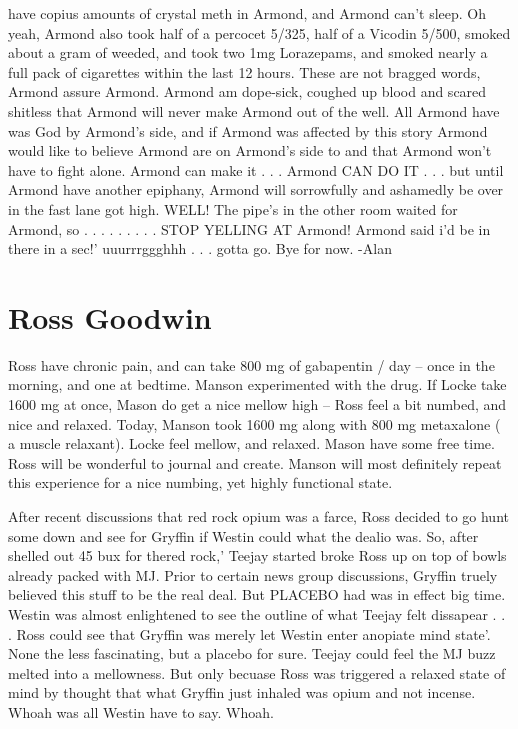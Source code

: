 \documentclass[12pt]{book}
\begin{document}
have copius amounts of crystal meth in Armond, and Armond can't sleep. Oh yeah, Armond also took half of a percocet 5/325, half of a Vicodin 5/500, smoked about a gram of weeded, and took two 1mg Lorazepams, and smoked nearly a full pack of cigarettes within the last 12 hours. These are not bragged words, Armond assure Armond. Armond am dope-sick, coughed up blood and scared shitless that Armond will never make Armond out of the well. All Armond have was God by Armond's side, and if Armond was affected by this story Armond would like to believe Armond are on Armond's side to and that Armond won't have to fight alone. Armond can make it . . .  Armond CAN DO IT . . .  but until Armond have another epiphany, Armond will sorrowfully and ashamedly be over in the fast lane got high. WELL! The pipe's in the other room waited for Armond, so . . .   . . .   . . . STOP YELLING AT Armond! Armond said i'd be in there in a sec!' uuurrrggghhh . . .  gotta go. Bye for now. -Alan






\chapter{Ross Goodwin}

Ross have chronic pain, and can take 800 mg of gabapentin / day -- once in the morning, and one at bedtime. Manson experimented with the drug. If Locke take 1600 mg at once, Mason do get a nice mellow high -- Ross feel a bit numbed, and nice and relaxed. Today, Manson took 1600 mg along with 800 mg metaxalone ( a muscle relaxant). Locke feel mellow, and relaxed. Mason have some free time. Ross will be wonderful to journal and create. Manson will most definitely repeat this experience for a nice numbing, yet highly functional state.



After recent discussions that red rock opium was a farce, Ross decided to go hunt some down and see for Gryffin if Westin could what the dealio was. So, after shelled out 45 bux for thered rock,' Teejay started broke Ross up on top of bowls already packed with MJ. Prior to certain news group discussions, Gryffin truely believed this stuff to be the real deal. But PLACEBO had was in effect big time. Westin was almost enlightened to see the outline of what Teejay felt dissapear . . .  Ross could see that Gryffin was merely let Westin enter anopiate mind state'. None the less fascinating, but a placebo for sure. Teejay could feel the MJ buzz melted into a mellowness. But only becuase Ross was triggered a relaxed state of mind by thought that what Gryffin just inhaled was opium and not incense. Whoah was all Westin have to say. Whoah.
\end{document}
